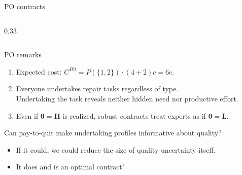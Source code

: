 \documentclass[10pt,aspectratio=169, compressed]{beamer}
\begin{document}
\begin{frame}[t]{PO contracts}
\begin{columns}[T,onlytextwidth]
\begin{column}{0.33\textwidth}
\\[5pt]
\end{column}

\end{columns}

\end{frame}












\begin{frame}{PO remarks}

\begin{enumerate}
\item 
{Expected cost:} \quad $C^{PO} = P(\{1,2\}) \cdot (4 + 2) c= {6} c$.\\[1em]

\item 	Everyone undertakes repair tasks regardless of type. \\[0.4em]
		
		Undertaking the task reveals neither hidden need nor productive effort.\\[1em]

\item 	Even if $\boldsymbol{\theta} = \mathbf{H}$ is realized, robust contracts treat experts as if $\boldsymbol{\theta} = \mathbf L$.\\

\end{enumerate}



\bigskip

Can pay-to-quit make undertaking profiles informative about quality?
\smallskip

\begin{itemize}
    \item If it could, we could reduce the size of quality uncertainty itself.
    \item It does and is an optimal contract!
\end{itemize}





\end{frame}
\end{document}
